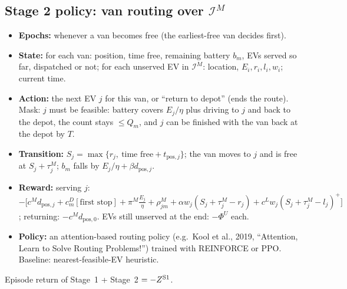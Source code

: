 \documentclass[11pt,a4paper]{article}
\newcommand{\I}{\mathcal{I}}
\begin{document}
\subsection{Stage 2 policy: van routing over $\I^M$}
\begin{itemize}[leftmargin=1.4em,itemsep=2pt]
  \item \textbf{Epochs:} whenever a van becomes free (the earliest-free van decides first).
  \item \textbf{State:} for each van: position, time free, remaining battery $b_m$, EVs served so far, dispatched or not; for each unserved EV in $\I^M$: location, $E_i,r_i,l_i,w_i$; current time.
  \item \textbf{Action:} the next EV $j$ for this van, or ``return to depot'' (ends the route). Mask: $j$ must be feasible: battery covers $E_j/\eta$ plus driving to $j$ and back to the depot, the count stays $\le Q_m$, and $j$ can be finished with the van back at the depot by $T$.
  \item \textbf{Transition:} $S_j=\max\{r_j,\ \text{time free}+t_{\text{pos},j}\}$; the van moves to $j$ and is free at $S_j+\tau^M_j$; $b_m$ falls by $E_j/\eta+\beta d_{\text{pos},j}$.
  \item \textbf{Reward:} serving $j$: $-\Big[c^Md_{\text{pos},j}+c^D_m[\text{first stop}]+\pi^M\frac{E_j}{\eta}+\rho^M_{jm}+\alpha w_j(S_j+\tau^M_j-r_j)+c^Lw_j(S_j+\tau^M_j-l_j)^+\Big]$; returning: $-c^Md_{\text{pos},0}$. EVs still unserved at the end: $-\Phi^U$ each.
  \item \textbf{Policy:} an attention-based routing policy (e.g.\ Kool et al., 2019, ``Attention, Learn to Solve Routing Problems!'') trained with REINFORCE or PPO. Baseline: nearest-feasible-EV heuristic.
\end{itemize}
Episode return of Stage~1 + Stage~2 $=-Z^{\text{S1}}$.
\end{document}
